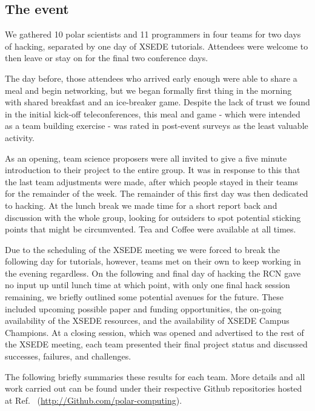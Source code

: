 \documentclass[conference]{IEEEtran}
\begin{document}
\subsection{The event}
We gathered 10 polar scientists and 11 programmers in four teams for two days of hacking, separated by one day of XSEDE tutorials. Attendees were welcome to then leave or stay on for the final two conference days.  

The day before, those attendees who arrived early enough were able to share a meal and begin networking, but we began formally first thing in the morning with shared breakfast and an ice-breaker game. Despite the lack of trust we found in the initial kick-off teleconferences, this meal and game - which were intended as a team building exercise - was rated in post-event surveys as the least valuable activity.

As an opening, team science proposers were all invited to give a five minute introduction to their project to the entire group. It was in response to this that the last team adjustments were made, after which people stayed in their teams for the remainder of the week. The remainder of this first day was then dedicated to hacking.  At the lunch break we made time for a short report back and discussion with the whole group, looking for outsiders to spot potential sticking points that might be circumvented.  Tea and Coffee were available at all times.

Due to the scheduling of the XSEDE meeting we were forced to break the following day for tutorials, however, teams met on their own to keep working in the evening regardless. On the following and final day of hacking the RCN gave no input up until lunch time at which point, with only one final hack session remaining, we briefly outlined some potential avenues for the future. These included upcoming possible paper and funding opportunities, the on-going availability of the XSEDE resources, and the availability of XSEDE Campus Champions. At a closing session, which was opened and advertised to the rest of the XSEDE meeting, each team presented their final project status and discussed successes, failures, and challenges.

The following briefly summaries these results for each team.  More details and all work carried out can be found under their respective Github repositories hosted at Ref.~\cite{polar-computing-Github} (\url{http://Github.com/polar-computing}). 
\end{document}
